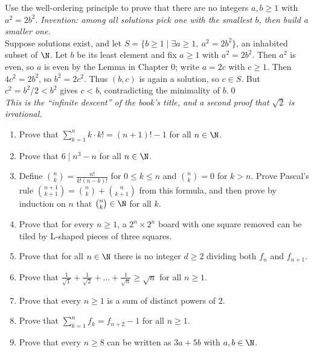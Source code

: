 \begin{bexample}
Use the well-ordering principle to prove that there are no integers $a,b\ge1$ with $a^2=2b^2$.
\solution
\emph{Invention: among all solutions pick one with the smallest $b$, then build a smaller one.}\\
Suppose solutions exist, and let $S=\{b\ge1\mid\exists a\ge1,\ a^2=2b^2\}$, an inhabited subset of $\N$. Let $b$ be its least element and fix $a\ge1$ with $a^2=2b^2$. Then $a^2$ is even, so $a$ is even by the Lemma in Chapter 0; write $a=2c$ with $c\ge1$. Then $4c^2=2b^2$, so $b^2=2c^2$. Thus $(b,c)$ is again a solution, so $c\in S$. But $c^2=b^2/2<b^2$ gives $c<b$, contradicting the minimality of $b$.\qed\\
\emph{This is the ``infinite descent'' of the book's title, and a second proof that $\sqrt2$ is irrational.}
\end{bexample}

\begin{stretchbox}[4]
\begin{enumerate}[label=\textbf{S4.\arabic*}, leftmargin=3em]
\item Prove that $\sum_{k=1}^nk\cdot k!=(n+1)!-1$ for all $n\in\N$.
\item Prove that $6\mid n^3-n$ for all $n\in\N$. 
\item Define $\binom nk=\frac{n!}{k!(n-k)!}$ for $0\le k\le n$ and $\binom nk=0$ for $k>n$. Prove Pascal's rule $\binom{n+1}{k+1}=\binom nk+\binom n{k+1}$ from this formula, and then prove by induction on $n$ that $\binom nk\in\N$ for all $k$.
\item Prove that for every $n\ge1$, a $2^n\times2^n$ board with one square removed can be tiled by L-shaped pieces of three squares. 
\item Prove that for all $n\in\N$ there is no integer $d\ge2$ dividing both $f_n$ and $f_{n+1}$. 
\item Prove that $\frac1{\sqrt1}+\frac1{\sqrt2}+\dots+\frac1{\sqrt n}\ge\sqrt n$ for all $n\ge1$. 
\item Prove that every $n\ge1$ is a sum of distinct powers of $2$. 
\item Prove that $\sum_{k=1}^nf_k=f_{n+2}-1$ for all $n\ge1$.
\item Prove that every $n\ge8$ can be written as $3a+5b$ with $a,b\in\N$. 
\end{enumerate}
\end{stretchbox}
